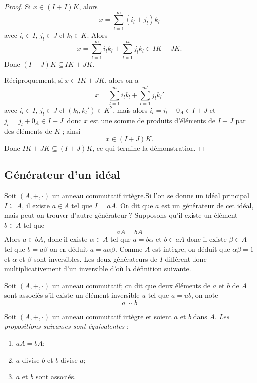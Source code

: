 \begin{proof}
    Si \( x \in (I+J)K \), alors 
\[
x = \sum_{l=1}^{m} (i_l + j_l) k_l
\]
avec \( i_l \in I \), \( j_l \in J \) et \( k_l \in K \). Alors 
\[
x = \sum_{l=1}^{m} i_l k_l + \sum_{l=1}^{m} j_l k_l \in IK + JK.
\]
Donc \( (I+J)K \subseteq IK + JK \).

Réciproquement, si \( x \in IK + JK \), alors on a 
\[
x = \sum_{l=1}^{m} i_l k_l + \sum_{l=1}^{m'} j_l k_l'
\]
avec \( i_l \in I \), \( j_l \in J \) et \( (k_l, k_l') \in K^2 \), mais alors 
\( i_l = i_l + 0_A \in I+J \) et \( j_l = j_l + 0_A \in I+J \), donc \( x \) est une somme de produits d'éléments de \( I+J \) par des éléments de \( K \) ; ainsi 
\[
x \in (I+J)K.
\]
Donc \( IK + JK \subseteq (I+J)K \), ce qui termine la démonstration.
\end{proof}

\subsection{Générateur d'un idéal}
Soit $(A,+,\cdot)$ un anneau commutatif intègre.Si l'on se donne un idéal principal $I\subseteq A$, il existe $a\in A$ tel que $I=aA$. On dit que $a$ est un générateur de cet idéal, mais peut-on trouver d'autre générateur ? Supposons qu'il existe un élément $b\in A$ tel que \[
aA=bA
\]
Alors $a\in bA$, donc il existe $\alpha \in A$ tel que $a=b\alpha$ et $b\in aA$ donc il existe $\beta\in A$ tel que $b=a\beta$ on en déduit $a=a\alpha\beta$. Comme $A$ est intègre, on déduit que $\alpha\beta=1$ et $\alpha$ et $\beta$ sont inversibles. Les deux générateurs de $I$ diffèrent donc multiplicativement d'un inversible d'où la définition suivante.


\begin{definition}
    Soit $(A,+,\cdot)$ un anneau commutatif; on dit que deux éléments de $a$ et $b$ de $A$ sont associés s'il existe un élément inversible $u$ tel que $a=ub$, on note \[
    a \sim b
    \]
\end{definition}


    \begin{proposition}
        Soit $(A,+,\cdot)$ un anneau commutatif intègre et soient $a$ et $b$ dans $A$. \textit{Les propositions suivantes sont équivalentes} :
\begin{enumerate}
    \item $aA = bA$;
    \item $a$ divise $b$ et $b$ divise $a$;
    \item $a$ et $b$ sont associés.
\end{enumerate}
    \end{proposition}


